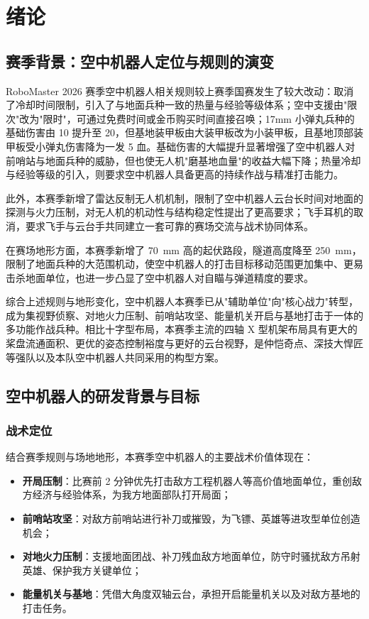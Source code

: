 \chapter{绪论}


\section{赛季背景：空中机器人定位与规则的演变}

RoboMaster 2026 赛季空中机器人相关规则较上赛季国赛发生了较大改动：取消了冷却时间限制，引入了与地面兵种一致的热量与经验等级体系；空中支援由"限次"改为"限时"，可通过免费时间或金币购买时间直接召唤；17mm 小弹丸兵种的基础伤害由 10 提升至 20，但基地装甲板由大装甲板改为小装甲板，且基地顶部装甲板受小弹丸伤害降为一发 5 血。基础伤害的大幅提升显著增强了空中机器人对前哨站与地面兵种的威胁，但也使无人机"磨基地血量"的收益大幅下降；热量冷却与经验等级的引入，则要求空中机器人具备更高的持续作战与精准打击能力。

此外，本赛季新增了雷达反制无人机机制，限制了空中机器人云台长时间对地面的探测与火力压制，对无人机的机动性与结构稳定性提出了更高要求；飞手耳机的取消，要求飞手与云台手共同建立一套可靠的赛场交流与战术协同体系。

在赛场地形方面，本赛季新增了 \qty{70}{\mm} 高的起伏路段，隧道高度降至 \qty{250}{\mm}，限制了地面兵种的大范围机动，使空中机器人的打击目标移动范围更加集中、更易击杀地面单位，也进一步凸显了空中机器人对自瞄与弹道精度的要求。

综合上述规则与地形变化，空中机器人本赛季已从"辅助单位"向"核心战力"转型，成为集视野侦察、对地火力压制、前哨站攻坚、能量机关开启与基地打击于一体的多功能作战兵种。相比十字型布局，本赛季主流的四轴 X 型机架布局具有更大的桨盘流通面积、更优的姿态控制裕度与更好的云台视野，是仲恺奇点、深技大悍匠等强队以及本队空中机器人共同采用的构型方案。

\section{空中机器人的研发背景与目标}

\subsection{战术定位}

结合赛季规则与场地地形，本赛季空中机器人的主要战术价值体现在：
\begin{itemize}
    \item \textbf{开局压制}：比赛前 2 分钟优先打击敌方工程机器人等高价值地面单位，重创敌方经济与经验体系，为我方地面部队打开局面；
    \item \textbf{前哨站攻坚}：对敌方前哨站进行补刀或摧毁，为飞镖、英雄等进攻型单位创造机会；
    \item \textbf{对地火力压制}：支援地面团战、补刀残血敌方地面单位，防守时骚扰敌方吊射英雄、保护我方关键单位；
    \item \textbf{能量机关与基地}：凭借大角度双轴云台，承担开启能量机关以及对敌方基地的打击任务。
\end{itemize}

